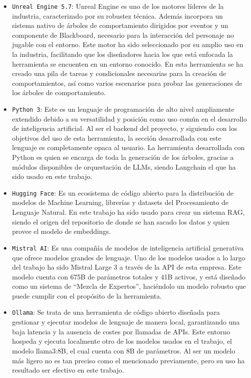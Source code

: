 \begin{itemize}
	\item \texttt{Unreal Engine 5.7}: Unreal Engine es uno de los motores líderes de la industria, caracterizado por su robustez técnica.
	Además incorpora un sistema nativo de árboles de comportamiento dirigidos por eventos y un componente de Blackboard, necesario para la interacción del personaje no jugable con el entorno.
	Este motor ha sido seleccionado por su amplio uso en la industria, facilitando que los diseñadores hacia los que está enfocada la herramienta se encuenten en un entorno conocido.
	En esta herramienta se ha creado una pila de tareas y condicionales necesarias para la creación de comportamientos, así como varios escenarios para probar las generaciones de los árboles de comportamiento.
	\item \texttt{Python 3}: Este es un lenguaje de programación de alto nivel ampliamente extendido debido a su versatilidad y posición como uso común en el desarrollo de inteligencia artificial.
	Al ser el backend del proyecto, y siguiendo con los objetivos del uso de esta herramienta, la sección desarrollada con este lenguaje es completamente opaca al usuario.
	La herramienta desarrollada con Python es quien se encarga de toda la generación de los árboles, gracias a módulos disponibles de orquestación de LLMs, siendo Langchain el que ha sido usado en este trabajo.
	\item \texttt{Hugging Face}: Es un ecosistema de código abierto para la distribución de modelos de Machine Learning, librerías y datasets del Procesamiento de Lenguaje Natural.
	En este trabajo ha sido usado para crear un sistema RAG, siendo el origen del repositorio de donde se han sacado los datos y quien provee el modelo de embeddings.
	\item \texttt{Mistral AI}: Es una compañía de modelos de inteligencia artificial generativa que ofrece modelos grandes de lenguaje.
	Uno de los modelos usados a lo largo del trabajo ha sido Mistral Large 3 a través de la API de esta empresa.
	Este modelo cuenta con 675B de parámetros totales y 41B activos, y está diseñado como un sistema de ``Mezcla de Expertos'', haciéndolo un modelo robusto que puede cumplir con el propósito de la herramienta.
	\item \texttt{Ollama}: Se trata de una herramienta de código abierto diseñada para gestionar y ejecutar modelos de lenguaje de manera local, garantizando una baja latencia y la ausencia de costes por llamadas de APIs.
	Este entorno hospeda y ejecuta localmente otro de los modelos usados en el trabajo, el modelo llama3:8B, el cual cuenta con 8B de parámetros.
	Al ser un modelo más ligero no es tan preciso como el mencionado previamente, pero su uso ha resultado ser efectivo en este trabajo.
\end{itemize}

